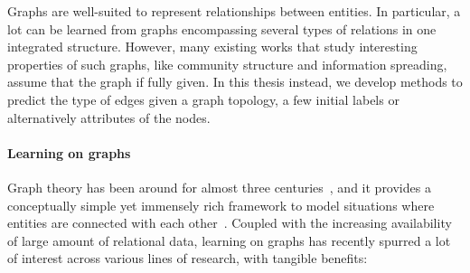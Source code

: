 Graphs are well-suited to represent relationships between entities. In particular, a lot can be learned
from graphs encompassing several types of relations in one integrated structure. However, many
existing works that study interesting properties of such graphs, like community structure and
information spreading, assume that the graph if fully given. In this thesis instead, we develop
methods to predict
the type of edges given a graph topology, a few initial labels or alternatively attributes of the nodes.
\smallskip

\paragraph{Learning on graphs}

Graph theory has been around for almost three centuries~\autocite{biggs1976graph}, and it provides a
conceptually simple yet immensely rich framework to model situations where entities are connected
with each other~\autocite{ComplexNetworksApp11}. Coupled with the increasing availability of large
amount of relational data, learning on graphs has recently spurred a lot of interest across various
lines of research, with tangible benefits:
